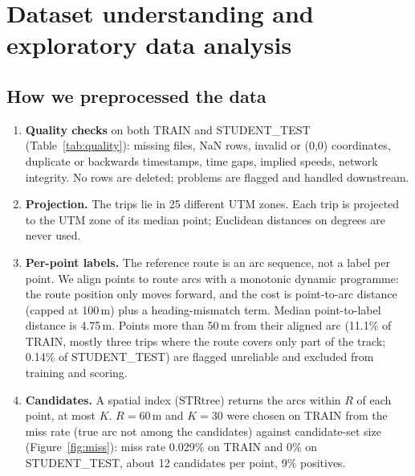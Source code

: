 \documentclass[11pt,a4paper]{article}
\begin{document}
\section{Dataset understanding and exploratory data analysis}
\subsection{How we preprocessed the data}
\begin{enumerate}\setlength\itemsep{0pt}
\item \textbf{Quality checks} on both TRAIN and STUDENT\_TEST (Table~\ref{tab:quality}): missing files, NaN rows,
invalid or (0,0) coordinates, duplicate or backwards timestamps, time gaps, implied speeds, network integrity. No
rows are deleted; problems are flagged and handled downstream.
\item \textbf{Projection.} The trips lie in 25 different UTM zones. Each trip is projected to the UTM zone of its
median point; Euclidean distances on degrees are never used.
\item \textbf{Per-point labels.} The reference route is an arc sequence, not a label per point. We align points to
route arcs with a monotonic dynamic programme: the route position only moves forward, and the cost is
point-to-arc distance (capped at 100\,m) plus a heading-mismatch term. Median point-to-label distance is 4.75\,m.
Points more than 50\,m from their aligned arc (11.1\% of TRAIN, mostly three trips where the route covers only part of
the track; 0.14\% of STUDENT\_TEST) are flagged unreliable and excluded from training and scoring.
\item \textbf{Candidates.} A spatial index (STRtree) returns the arcs within $R$ of each point, at most $K$. $R=60$\,m
and $K=30$ were chosen on TRAIN from the miss rate (true arc not among the candidates) against candidate-set size
(Figure~\ref{fig:miss}): miss rate 0.029\% on TRAIN and 0\% on STUDENT\_TEST, about 12 candidates per point, 9\%
positives.
\end{enumerate}
\end{document}
